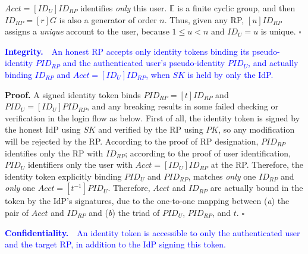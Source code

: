 $Acct =  [ID_U]ID_{RP}$ identifies \emph{only} this user.
$\mathbb{E}$ is a finite cyclic group,
    and then $ID_{RP} = [r]G$ is also a generator of order $n$.
Thus, given any RP,
    $[u]ID_{RP}$ assigns a \emph{unique} account to the user,
        because $1 \leq u < n$ and $ID_U = u$ is unique. $\square$


\vspace{1mm}
\noindent\textcolor{blue}{\textbf{Integrity.}~~An honest RP accepts only identity tokens
 binding its pseudo-identity $PID_{RP}$ and the authenticated user's pseudo-identity $PID_U$,
 and actually binding $ID_{RP}$ and $Acct=[ID_U]ID_{RP}$,
 when $SK$ is held by only the IdP.}

\vspace{0.75mm}
\noindent\textbf{Proof.}
A signed identity token binds $PID_{RP} = [t]ID_{RP}$ and $PID_U = [ID_U]PID_{RP}$,
    and any breaking results in some failed checking or verification in the login flow as below.
First of all, the identity token is signed by the honest IdP using $SK$
        and verified by the RP using $PK$,
        so any modification will be rejected by the RP.
According to the proof of RP designation,
   $PID_{RP}$ identifies only the RP with $ID_{RP}$;
   according to the proof of user identification,
    $PID_U$ identifiers only the user with $Acct = [ID_U]ID_{RP}$ at the RP.
Therefore, the identity token explicitly binding $PID_U$ and $PID_{RP}$,
    matches \emph{only} one $ID_{RP}$ and \emph{only} one $Acct = [t^{-1}]PID_{U}$.
Therefore,
    $Acct$ and $ID_{RP}$ are actually bound in the token by the IdP's signatures,
        due to the one-to-one mapping between (\emph{a}) the pair of $Acct$ and $ID_{RP}$ and (\emph{b}) the triad of $PID_U$, $PID_{RP}$, and $t$. $\square$


\vspace{1mm}
\noindent\textcolor{blue}{\textbf{Confidentiality.}~~An identity token
    is accessible to only
                the authenticated user and the target RP, in addition to the IdP signing this token.}

